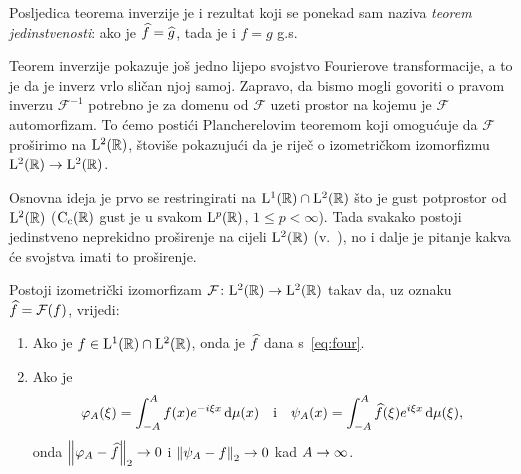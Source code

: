 \documentclass[main.tex]{subfiles}
\begin{document}
Posljedica teorema inverzije je i rezultat koji se ponekad sam
naziva \emph{teorem jedinstvenosti}: ako je
\( \widehat{f} = \widehat{g} \), tada je i \( f=g \) g.s.

Teorem inverzije pokazuje još jedno lijepo svojstvo Fourierove transformacije,
a to je da je inverz vrlo sličan njoj samoj. Zapravo, da bismo mogli
govoriti o pravom inverzu \( \mathcal F^{-1} \) potrebno je za
domenu od \( \mathcal F \) uzeti prostor na kojemu
je \( \mathcal F \) automorfizam.
To ćemo postići Plancherelovim teoremom koji omogućuje da \( \mathcal F \)
proširimo na \( \mathrm{L}^2(\mathbb{R}) \), štoviše pokazujući da je riječ o izometričkom
izomorfizmu \( \mathrm{L}^2(\mathbb{R}) \to \mathrm{L}^2(\mathbb{R}) \).

Osnovna ideja je prvo se restringirati na \( \mathrm{L}^1(\mathbb{R}) \cap \mathrm{L}^2(\mathbb{R}) \)
što je gust potprostor od \( \mathrm{L}^2(\mathbb{R}) \) (\( \mathrm{C}_{\mathrm{c}}(\mathbb{R}) \) gust je u svakom
\( \mathrm{L}^p(\mathbb{R}) \), \( 1 \le p < \infty \)). Tada svakako postoji
jedinstveno neprekidno proširenje na cijeli \( \mathrm{L}^2(\mathbb{R}) \) (v.~\cite[prop.~1.6.8~(iv)]{gogic}),
no i dalje je pitanje kakva će svojstva imati to proširenje.

\begin{teorem}\label{tm:planche}
	Postoji izometrički izomorfizam \( \mathcal F \colon \mathrm{L}^2(\mathbb{R}) \to \mathrm{L}^2(\mathbb{R}) \)
	takav da, uz oznaku \( \widehat{f} = \mathcal F(f) \), vrijedi:
	\begin{enumerate}[label=(\roman*)]
		\item Ako je \( f \in \mathrm{L}^1(\mathbb{R}) \cap \mathrm{L}^2(\mathbb{R}) \), onda je \( \widehat{f} \)
		      dana s~\eqref{eq:four}. \label{i:planche1}
		\item Ako je
		      \begin{equation}
			      \varphi_A(\xi) = \int_{-A}^A f(x)e^{-i\xi x} \,\mathrm d \mu(x)
			      \quad \mathrm i \quad
			      \psi_A(x) = \int_{-A}^A \widehat{f}(\xi) e^{i\xi x} \,\mathrm d \mu(\xi),
		      \end{equation}
		      onda \( \left\lVert\varphi_A - \widehat{f}\right\rVert_2 \rightarrow 0 \) i \( \left\lVert\psi_A - f\right\rVert_2 \rightarrow 0 \)
		      kad \( A \rightarrow \infty \). \label{i:planche2}
	\end{enumerate}
\end{teorem}
\end{document}
